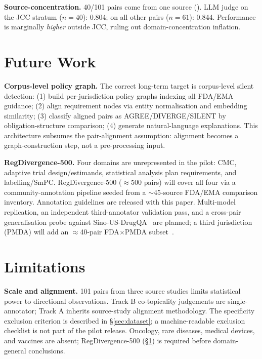 \documentclass[manuscript]{acmart}
\begin{document}
\textbf{Source-concentration.} 40/101 pairs come from one source
(\citeauthor{uc2025jcc}). LLM judge on the JCC stratum ($n = 40$): 0.804;
on all other pairs ($n = 61$): 0.844. Performance is marginally
\textit{higher} outside JCC, ruling out domain-concentration inflation.

\section{Future Work}
\label{sec:futurework}

\textbf{Corpus-level policy graph.}
The correct long-term target is corpus-level silent detection: (1) build
per-jurisdiction policy graphs indexing all FDA/EMA guidance; (2) align
requirement nodes via entity normalisation and embedding similarity; (3)
classify aligned pairs as AGREE/DIVERGE/SILENT by obligation-structure
comparison; (4) generate natural-language explanations. This architecture
subsumes the pair-alignment assumption: alignment becomes a graph-construction
step, not a pre-processing input.

\textbf{RegDivergence-500.}
Four domains are unrepresented in the pilot: CMC, adaptive trial
design/estimands, statistical analysis plan requirements, and labelling/SmPC.
RegDivergence-500 ($\approx$500 pairs) will cover all four via a
community-annotation pipeline seeded from a $\sim$45-source FDA/EMA comparison
inventory. Annotation guidelines are released with this paper. Multi-model
replication, an independent third-annotator validation pass, and a cross-pair
generalisation probe against Sino-US-DrugQA~\cite{sinousdrugqa2026} are
planned; a third jurisdiction (PMDA) will add an
$\approx$40-pair FDA$\times$PMDA subset~\cite{mita2026doses,gomezfernandez2026inhibitors}.

\section{Limitations}
\label{sec:limitations}

\textbf{Scale and alignment.} 101 pairs from three source studies limits
statistical power to directional observations. Track B co-topicality judgements
are single-annotator; Track A inherits source-study alignment methodology.
The specificity exclusion criterion is described in \S\ref{sec:dataset}; a machine-readable exclusion checklist is not part of the pilot release. Oncology, rare diseases, medical
devices, and vaccines are absent; RegDivergence-500 (\S\ref{sec:futurework})
is required before domain-general conclusions.
\end{document}
